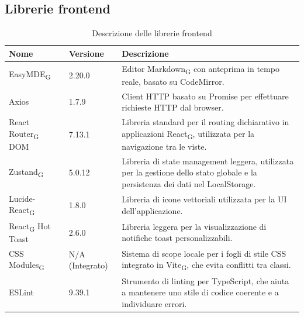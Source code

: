 \documentclass[11pt,a4paper]{article}
\newcommand{\gls}[1]{#1\textsubscript{G}}
\begin{document}
\subsection{Librerie frontend}
\begin{table}[H]
    \centering
    \begin{tabular}{|p{}|p{}|p{}|}
        \hline
        \textbf{Nome} & \textbf{Versione} & \textbf{Descrizione} \\
        \hline
        \gls{EasyMDE} & 2.20.0 & Editor \gls{Markdown} con anteprima in tempo reale, basato su CodeMirror. \\
        \hline
        Axios & 1.7.9 & Client HTTP basato su Promise per effettuare richieste HTTP dal browser. \\
        \hline
        \gls{React Router} DOM & 7.13.1 & Libreria standard per il routing dichiarativo in applicazioni \gls{React}, utilizzata per la navigazione tra le viste. \\
        \hline
        \gls{Zustand} & 5.0.12 & Libreria di state management leggera, utilizzata per la gestione dello stato globale e la persistenza dei dati nel LocalStorage. \\
        \hline
        Lucide-\gls{React} & 1.8.0 & Libreria di icone vettoriali utilizzata per la UI dell'applicazione. \\
        \hline
        \gls{React} Hot Toast & 2.6.0 & Libreria leggera per la visualizzazione di notifiche toast personalizzabili. \\
        \hline
        \gls{CSS Modules} & N/A (Integrato) & Sistema di scope locale per i fogli di stile CSS integrato in \gls{Vite}, che evita conflitti tra classi. \\
        \hline
        ESLint & 9.39.1 & Strumento di linting per TypeScript, che aiuta a mantenere uno stile di codice coerente e a individuare errori. \\
        \hline
    \end{tabular}
    \caption{Descrizione delle librerie frontend}
    \label{tab:librerie_frontend}
\end{table}
\end{document}
